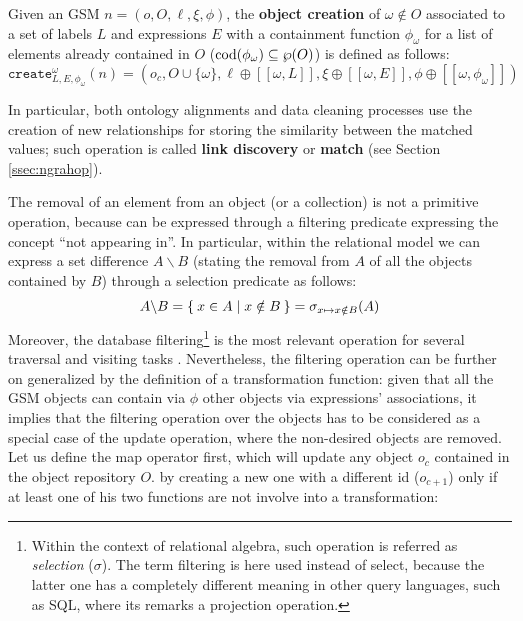 \begin{definition}\label{gsql:objcreate}
	Given an GSM $n=(o,O,\ell,\xi,\phi)$,  the \textbf{object creation} of $\omega\notin O$ associated to a set of labels $L$ and expressions $E$ with a containment function $\phi_\omega$ for a list of elements already contained in $O$ ($\operatorname{cod}(\phi_\omega)\subseteq \wp(O)$) is defined as follows:
	\[\texttt{create}^\omega_{L,E,\phi_\omega}(n)=(o_c,O\cup\{\omega\},\ell\oplus[[\omega, L]],\xi\oplus[[\omega, E]],\phi\oplus[[\omega,\phi_\omega]])\]
\end{definition}

 In particular, both ontology alignments and data cleaning processes \cite{ALIEH17} use the creation of new relationships for storing the similarity between the matched values; such operation is called \textbf{link discovery} or \textbf{match} (see Section \vref{ssec:ngrahop}).

The removal of an element from an object (or a collection) is not a primitive operation, because can be expressed through a filtering predicate expressing the concept ``not appearing in''. In particular, within the relational model we can express a set difference $A\backslash B$ (stating the removal from $A$ of all the objects contained by $B$) through a selection predicate as follows:
\begin{equation}\label{eq:difference}
A\backslash B = \Set{x\in A | x\notin B}=\sigma_{x\mapsto x\notin B}(A)
\end{equation}
Moreover, the  database filtering\footnote{Within the context of relational algebra, such operation is referred as \textit{selection} ($\sigma$). The term filtering is here used instead of select, because the latter one has a completely different meaning in other query languages, such as SQL, where its remarks a projection operation.} is the most relevant operation for several traversal and visiting tasks \cite{ThakkarPAV17,Neo4jAlg,MartonSV17,NautiLOD}. Nevertheless, the filtering operation can be further on generalized by the definition of a transformation function: given that all the GSM objects can contain via $\phi$ other objects via expressions' associations, it implies that the filtering operation over the objects has to be considered as a special case of the update operation, where the non-desired objects are removed.  Let us define the map operator first, which will update any object $o_c$ contained in the object repository $O$. by creating a new one with a different id ($o_{c+1}$) only if at least one of his two functions are not involve into a transformation:

